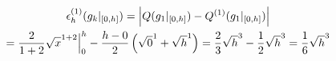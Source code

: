 \begin{multline*}
    \epsilon_h^{(1)}(g_k|_{[0, h]})
    =   \left | 
            Q(g_1|_{[0, h]}) -
            Q^{(1)}(g_1|_{[0, h]})
         \right | \\
    =   \frac{2}{1+2}
        \sqrt{x}^{1+2} \Big |_0^h -
        \frac{h-0}{2} \left ( \sqrt{0}^1 + \sqrt{h}^1 \right )
    =   \frac{2}{3} \sqrt{h}^3 -
        \frac{1}{2} \sqrt{h}^3
    =   \frac{1}{6} \sqrt{h}^3
\end{multline*}